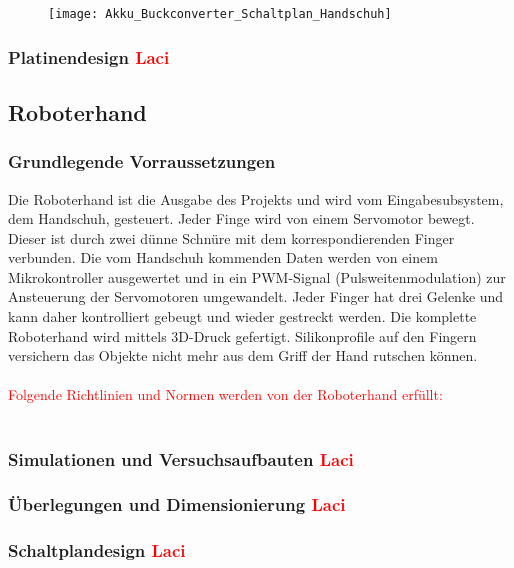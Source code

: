 \documentclass[titlepage,12pt,twoside]{article}
\begin{document}
\begin{figure}[H]
	\begin{center}
		\scalebox{0.5}
		{\texttt{[image: Akku\_Buckconverter\_Schaltplan\_Handschuh]}}
	\end{center}
\end{figure}

\subsubsection{Platinendesign \textcolor{red}{Laci}}

\subsection{Roboterhand}

\subsubsection{Grundlegende Vorraussetzungen}

Die Roboterhand ist die Ausgabe des Projekts und wird vom Eingabesubsystem, dem Handschuh, gesteuert. Jeder Finge wird von einem Servomotor 
bewegt. Dieser ist durch zwei dünne Schnüre mit dem korrespondierenden Finger verbunden. Die vom Handschuh kommenden 
Daten werden von einem Mikrokontroller ausgewertet und in ein PWM-Signal (Pulsweitenmodulation) zur Ansteuerung der 
Servomotoren umgewandelt. Jeder Finger hat drei Gelenke und kann daher kontrolliert gebeugt und wieder gestreckt werden. 
Die komplette Roboterhand wird mittels 3D-Druck gefertigt. Silikonprofile auf den Fingern versichern das Objekte nicht 
mehr aus dem Griff der Hand rutschen können.\\
\\
\textcolor{red}{Folgende Richtlinien und Normen werden von der Roboterhand erfüllt:}\\
\\

\subsubsection{Simulationen und Versuchsaufbauten \textcolor{red}{Laci}}
\subsubsection{Überlegungen und Dimensionierung \textcolor{red}{Laci}}
\subsubsection{Schaltplandesign \textcolor{red}{Laci}}
\end{document}
